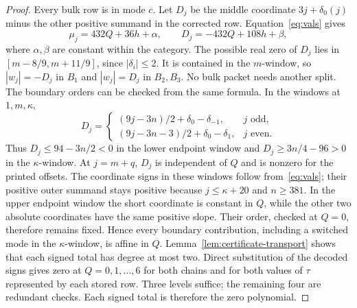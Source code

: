 \begin{proof}
Every bulk row is in mode $c$. Let $D_j$ be the middle coordinate $3j+\delta_0(j)$ minus
the other positive summand in the corrected row. Equation~\eqref{eq:vals} gives
\[
 \mu_j=432Q+36h+\alpha,\qquad D_j=-432Q+108h+\beta,
\]
where $\alpha,\beta$ are constant within the category. The possible real zero of $D_j$ lies
in $[m-8/9,m+11/9]$, since $|\delta_i|\le2$. It is contained in the $m$-window, so
$|w_j|=-D_j$ in $B_1$ and $|w_j|=D_j$ in $B_2,B_3$. No bulk packet needs another split.
The boundary orders can be checked from the same formula. In the windows at $1,m,\kappa$,
\[
 D_j=\begin{cases}
 (9j-3n)/2+\delta_0-\delta_{-1},&j\text{ odd},\\
 (9j-3n-3)/2+\delta_0-\delta_1,&j\text{ even}.
 \end{cases}
\]
Thus $D_j\le94-3n/2<0$ in the lower endpoint window and
$D_j\ge3n/4-96>0$ in the $\kappa$-window. At $j=m+q$, $D_j$ is independent of $Q$
and is nonzero for the printed offsets.
The coordinate signs in these windows follow from~\eqref{eq:vals}; their positive outer
summand stays positive because $j\le\kappa+20$ and $n\ge381$.
In the upper endpoint window the short coordinate is constant in $Q$, while the other
two absolute coordinates have the same positive slope. Their order, checked at $Q=0$,
therefore remains fixed. Hence every boundary contribution, including a switched mode
in the $\kappa$-window, is affine in $Q$.
Lemma~\ref{lem:certificate-transport} shows that each signed total has degree at most two.
Direct substitution of the
decoded signs gives zero at $Q=0,1,\ldots,6$ for both chains and for both values of $\tau$ represented
by each stored row.  Three levels suffice; the remaining four are redundant checks.
Each signed total is therefore the zero polynomial.
\end{proof}

